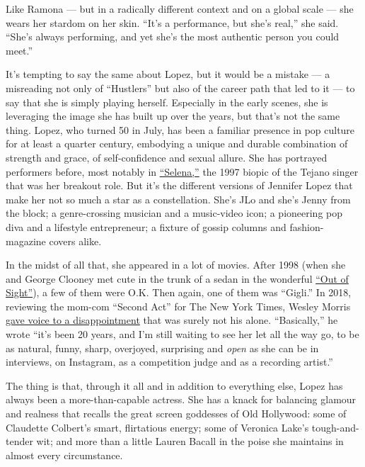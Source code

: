 Like Ramona --- but in a radically different context and on a global
scale --- she wears her stardom on her skin. ``It's a performance, but
she's real,'' she said. ``She's always performing, and yet she's the
most authentic person you could meet.''

It's tempting to say the same about Lopez, but it would be a mistake ---
a misreading not only of ``Hustlers'' but also of the career path that
led to it --- to say that she is simply playing herself. Especially in
the early scenes, she is leveraging the image she has built up over the
years, but that's not the same thing. Lopez, who turned 50 in July, has
been a familiar presence in pop culture for at least a quarter century,
embodying a unique and durable combination of strength and grace, of
self-confidence and sexual allure. She has portrayed performers before,
most notably in
\href{https://www.nytimes3xbfgragh.onion/1997/03/21/movies/a-short-life-remembered-with-songs-and-sunshine.html}{``Selena,''}
the 1997 biopic of the Tejano singer that was her breakout role. But
it's the different versions of Jennifer Lopez that make her not so much
a star as a constellation. She's JLo and she's Jenny from the block; a
genre-crossing musician and a music-video icon; a pioneering pop diva
and a lifestyle entrepreneur; a fixture of gossip columns and
fashion-magazine covers alike.

In the midst of all that, she appeared in a lot of movies. After 1998
(when she and George Clooney met cute in the trunk of a sedan in the
wonderful
\href{https://archive.nytimes3xbfgragh.onion/www.nytimes3xbfgragh.onion/library/film/062698sight-film-review.html}{``Out
of Sight''}), a few of them were O.K. Then again, one of them was
``Gigli.'' In 2018, reviewing the mom-com ``Second Act'' for The New
York Times, Wesley Morris
\href{https://www.nytimes3xbfgragh.onion/2018/12/19/movies/second-act-review-jennifer-lopez.html}{gave
voice to a disappointment} that was surely not his alone. ``Basically,''
he wrote ``it's been 20 years, and I'm still waiting to see her let all
the way go, to be as natural, funny, sharp, overjoyed, surprising and
\emph{open} as she can be in interviews, on Instagram, as a competition
judge and as a recording artist.''

The thing is that, through it all and in addition to everything else,
Lopez has always been a more-than-capable actress. She has a knack for
balancing glamour and realness that recalls the great screen goddesses
of Old Hollywood: some of Claudette Colbert's smart, flirtatious energy;
some of Veronica Lake's tough-and-tender wit; and more than a little
Lauren Bacall in the poise she maintains in almost every circumstance.

